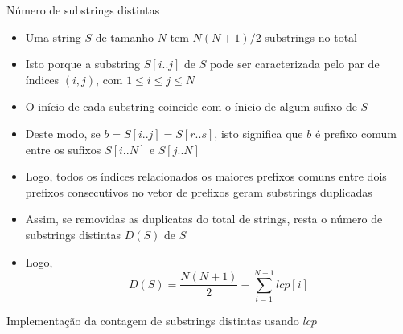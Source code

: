 \begin{frame}[fragile]{Número de substrings distintas}

    \begin{itemize}
        \item Uma string $S$ de tamanho $N$ tem $N(N + 1)/2$ substrings no total

        \item Isto porque a substring $S[i..j]$ de $S$ pode ser caracterizada pelo par de índices
            $(i, j)$, com $1\leq i\leq j\leq N$

        \item O início de cada substring coincide com o ínicio de algum sufixo de $S$

        \item Deste modo, se $b = S[i..j] = S[r..s]$, isto significa que $b$ é prefixo comum entre              os sufixos $S[i..N]$ e $S[j..N]$

        \item Logo, todos os índices relacionados os maiores prefixos comuns entre dois
            prefixos consecutivos no vetor de prefixos geram substrings duplicadas

        \item Assim, se removidas as duplicatas do total de strings, resta o número de
            substrings distintas $D(S)$ de $S$

        \item Logo,
        \[
            D(S) = \frac{N(N + 1)}{2} - \sum_{i = 1}^{N - 1} lcp[i]
        \]
    \end{itemize}

\end{frame}

\begin{frame}[fragile]{Implementação da contagem de substrings distintas usando $lcp$}
\end{frame}
